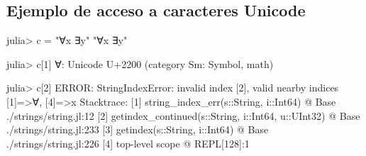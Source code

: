 \documentclass[
  letterpaper,
  DIV=11,
  numbers=noendperiod]{scrreprt}
\newenvironment{Shaded}{\begin{snugshade}}{\end{snugshade}}
\newcommand{\BuiltInTok}[1]{\textcolor[rgb]{0.00,0.23,0.31}{#1}}
\newcommand{\CharTok}[1]{\textcolor[rgb]{0.13,0.47,0.30}{#1}}
\newcommand{\DataTypeTok}[1]{\textcolor[rgb]{0.68,0.00,0.00}{#1}}
\newcommand{\FloatTok}[1]{\textcolor[rgb]{0.68,0.00,0.00}{#1}}
\newcommand{\FunctionTok}[1]{\textcolor[rgb]{0.28,0.35,0.67}{#1}}
\newcommand{\NormalTok}[1]{\textcolor[rgb]{0.00,0.23,0.31}{#1}}
\newcommand{\OperatorTok}[1]{\textcolor[rgb]{0.37,0.37,0.37}{#1}}
\newcommand{\StringTok}[1]{\textcolor[rgb]{0.13,0.47,0.30}{#1}}
\begin{document}
\hypertarget{ejemplo-de-acceso-a-caracteres-unicode}{%
\subsection{Ejemplo de acceso a caracteres
Unicode}\label{ejemplo-de-acceso-a-caracteres-unicode}}

\begin{Shaded}
\begin{Highlighting}[]
\NormalTok{julia}\OperatorTok{\textgreater{}}\NormalTok{ c }\OperatorTok{=} \StringTok{"∀x ∃y"}
\StringTok{"∀x ∃y"}

\NormalTok{julia}\OperatorTok{\textgreater{}}\NormalTok{ c[}\FloatTok{1}\NormalTok{]}
\CharTok{\textquotesingle{}∀\textquotesingle{}}\OperatorTok{:} \BuiltInTok{Unicode}\NormalTok{ U}\OperatorTok{+}\FloatTok{2200}\NormalTok{ (category Sm}\OperatorTok{:} \DataTypeTok{Symbol}\NormalTok{, math)}

\NormalTok{julia}\OperatorTok{\textgreater{}}\NormalTok{ c[}\FloatTok{2}\NormalTok{]}
\NormalTok{ERROR}\OperatorTok{:} \DataTypeTok{StringIndexError}\OperatorTok{:}\NormalTok{ invalid index [}\FloatTok{2}\NormalTok{], }
\NormalTok{valid nearby indices [}\FloatTok{1}\NormalTok{]}\OperatorTok{=\textgreater{}}\CharTok{\textquotesingle{}∀\textquotesingle{}}\NormalTok{, [}\FloatTok{4}\NormalTok{]}\OperatorTok{=\textgreater{}}\CharTok{\textquotesingle{}x\textquotesingle{}}
\NormalTok{Stacktrace}\OperatorTok{:}
\NormalTok{ [}\FloatTok{1}\NormalTok{] }\FunctionTok{string\_index\_err}\NormalTok{(s}\OperatorTok{::}\DataTypeTok{String}\NormalTok{, i}\OperatorTok{::}\DataTypeTok{Int64}\NormalTok{)}
\NormalTok{   @ }\BuiltInTok{Base} \OperatorTok{./}\NormalTok{strings}\OperatorTok{/}\NormalTok{string.jl}\OperatorTok{:}\FloatTok{12}
\NormalTok{ [}\FloatTok{2}\NormalTok{] }\FunctionTok{getindex\_continued}\NormalTok{(s}\OperatorTok{::}\DataTypeTok{String}\NormalTok{, i}\OperatorTok{::}\DataTypeTok{Int64}\NormalTok{, u}\OperatorTok{::}\DataTypeTok{UInt32}\NormalTok{)}
\NormalTok{   @ }\BuiltInTok{Base} \OperatorTok{./}\NormalTok{strings}\OperatorTok{/}\NormalTok{string.jl}\OperatorTok{:}\FloatTok{233}
\NormalTok{ [}\FloatTok{3}\NormalTok{] }\FunctionTok{getindex}\NormalTok{(s}\OperatorTok{::}\DataTypeTok{String}\NormalTok{, i}\OperatorTok{::}\DataTypeTok{Int64}\NormalTok{)}
\NormalTok{   @ }\BuiltInTok{Base} \OperatorTok{./}\NormalTok{strings}\OperatorTok{/}\NormalTok{string.jl}\OperatorTok{:}\FloatTok{226}
\NormalTok{ [}\FloatTok{4}\NormalTok{] top}\OperatorTok{{-}}\NormalTok{level scope}
\NormalTok{   @ }\BuiltInTok{REPL}\NormalTok{[}\FloatTok{128}\NormalTok{]}\OperatorTok{:}\FloatTok{1}
\end{Highlighting}
\end{Shaded}
\end{document}
